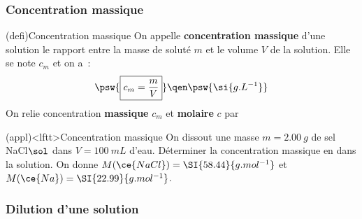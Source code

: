 \documentclass[../../main/main.tex]{subfiles}
\begin{document}
\subsubsection{Concentration massique}

\begin{tcb*}[label=def:cmol, sidebyside](defi){Concentration massique}
	On appelle \textbf{concentration massique} d'une solution le
	rapport entre la masse de soluté $m$ et le volume $V$ de
	la solution. Elle se note $c_m$ et on a~:
	\[
		\psw{%
			\boxed{c_m = \frac{m}{V}}
		}%
		\qen
		\psw{%
			\si{g.L^{-1}}
		}%
	\]
	\vspace{-15pt}
	\tcblower
	On relie concentration \textbf{massique} $c_m$ et \textbf{molaire} $c$ par
	\psw{%
		\[ \boxed{c_m = cM}\]
	}%
	\vspace{-15pt}
\end{tcb*}

\begin{tcb}[label=exem:cmol](appl)<lftt>{Concentration massique}
	On dissout une masse $m = \SI{2.00}{g}$ de sel NaCl$\sol$ dans
	$V = \SI{100}{mL}$ d'eau.
	\smallbreak
	Déterminer la concentration massique en  dans la solution.
	\smallbreak
	On donne
	$M(\ce{NaCl}) = \SI{58.44}{g.mol^{-1}}$ et
	$M(\ce{Na}) = \SI{22.99}{g.mol^{-1}}$.
	\tcblower
	\vspace{-15pt}
\end{tcb}

\subsubsection{Dilution d'une solution}
\end{document}
